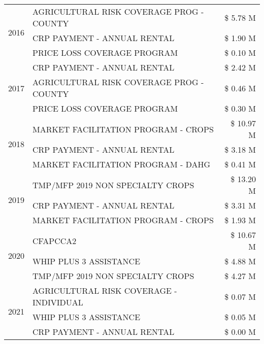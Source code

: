 \begin{tabular}{llr}
\cline{1-3}
\multirow[t]{3}{*}{2016} & AGRICULTURAL RISK COVERAGE PROG - COUNTY & \$ 5.78 M \\
 & CRP PAYMENT - ANNUAL RENTAL & \$ 1.90 M \\
 & PRICE LOSS COVERAGE PROGRAM & \$ 0.10 M \\
\cline{1-3}
\multirow[t]{3}{*}{2017} & CRP PAYMENT - ANNUAL RENTAL & \$ 2.42 M \\
 & AGRICULTURAL RISK COVERAGE PROG - COUNTY & \$ 0.46 M \\
 & PRICE LOSS COVERAGE PROGRAM & \$ 0.30 M \\
\cline{1-3}
\multirow[t]{3}{*}{2018} & MARKET FACILITATION PROGRAM - CROPS & \$ 10.97 M \\
 & CRP PAYMENT - ANNUAL RENTAL & \$ 3.18 M \\
 & MARKET FACILITATION PROGRAM - DAHG & \$ 0.41 M \\
\cline{1-3}
\multirow[t]{3}{*}{2019} & TMP/MFP 2019 NON SPECIALTY CROPS & \$ 13.20 M \\
 & CRP PAYMENT - ANNUAL RENTAL & \$ 3.31 M \\
 & MARKET FACILITATION PROGRAM - CROPS & \$ 1.93 M \\
\cline{1-3}
\multirow[t]{3}{*}{2020} & CFAPCCA2 & \$ 10.67 M \\
 & WHIP PLUS 3 ASSISTANCE & \$ 4.88 M \\
 & TMP/MFP 2019 NON SPECIALTY CROPS & \$ 4.27 M \\
\cline{1-3}
\multirow[t]{3}{*}{2021} & AGRICULTURAL RISK COVERAGE - INDIVIDUAL & \$ 0.07 M \\
 & WHIP PLUS 3 ASSISTANCE & \$ 0.05 M \\
 & CRP PAYMENT - ANNUAL RENTAL & \$ 0.00 M \\
\cline{1-3}
\bottomrule
\end{tabular}
